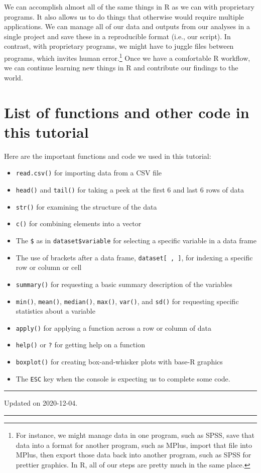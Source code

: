 \documentclass[
]{book}
\providecommand{\tightlist}{%
  \setlength{\itemsep}{0pt}\setlength{\parskip}{0pt}}
\begin{document}
We can accomplish almost all of the same things in R as we can with proprietary programs. It also allows us to do things that otherwise would require multiple applications. We can manage all of our data and outputs from our analyses in a single project and save these in a reproducible format (i.e., our script). In contrast, with proprietary programs, we might have to juggle files between programs, which invites human error.\footnote{For instance, we might manage data in one program, such as SPSS, save that data into a format for another program, such as MPlus, import that file into MPlus, then export those data back into another program, such as SPSS for prettier graphics. In R, all of our steps are pretty much in the same place.} Once we have a comfortable R workflow, we can continue learning new things in R and contribute our findings to the world.

\hypertarget{listoffunc}{%
\chapter{List of functions and other code in this tutorial}\label{listoffunc}}

Here are the important functions and code we used in this tutorial:

\begin{itemize}
\tightlist
\item
  \texttt{read.csv()} for importing data from a CSV file\\
\item
  \texttt{head()} and \texttt{tail()} for taking a peek at the first 6 and last 6 rows of data\\
\item
  \texttt{str()} for examining the structure of the data
\item
  \texttt{c()} for combining elements into a vector
\item
  The \texttt{\$} as in \texttt{dataset\$variable} for selecting a specific variable in a data frame
\item
  The use of brackets after a data frame, \texttt{dataset{[}\ ,\ {]}}, for indexing a specific row or column or cell
\item
  \texttt{summary()} for requesting a basic summary description of the variables
\item
  \texttt{min()}, \texttt{mean()}, \texttt{median()}, \texttt{max()}, \texttt{var()}, and \texttt{sd()} for requesting specific statistics about a variable
\item
  \texttt{apply()} for applying a function across a row or column of data
\item
  \texttt{help()} or \texttt{?} for getting help on a function
\item
  \texttt{boxplot()} for creating box-and-whisker plots with base-R graphics
\item
  The \texttt{ESC} key when the console is expecting us to complete some code.
\end{itemize}

\begin{center}\rule{0.5\linewidth}{0.5pt}\end{center}

Updated on 2020-12-04.

\begin{center}\rule{0.5\linewidth}{0.5pt}\end{center}

  
\end{document}
